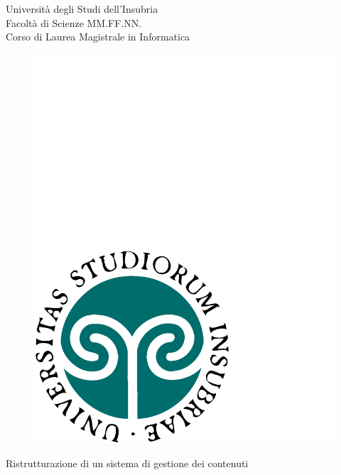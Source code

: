 \begin{titlepage}
  \begin{center}
  \begin{large}
  {\fontsize{20.74}{18}\selectfont\vspace*{0.50cm}Universit\`a degli Studi dell'Insubria}\\
  Facolt\`a di Scienze MM.FF.NN.\\
  Corso di Laurea Magistrale in Informatica
  \end{large}

  \vspace{1cm}
  \begin{figure}[h]
    \begin{center}
      \includegraphics[scale=0.25]{copertina/logounivector.pdf}
    \end{center}
  \end{figure}

    {\fontsize{26}{26}\selectfont\par\vspace*{0.75cm}
    Ristrutturazione di un sistema
    \vspace{.15em}di gestione dei contenuti}
    \par


\end{center}
\end{titlepage}

